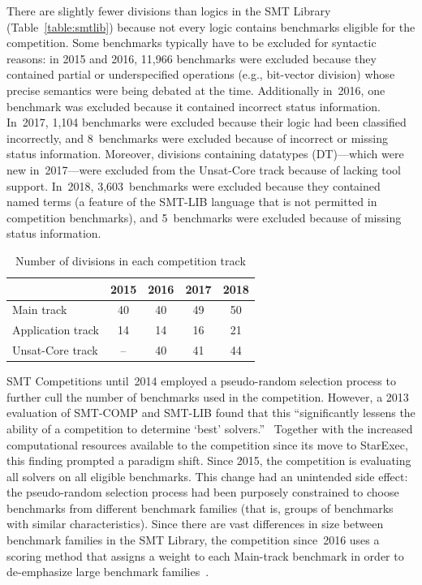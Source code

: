 \documentclass[dvipsnames,table,twoside,11pt]{article}
\begin{document}
There are slightly fewer divisions than logics in the SMT Library
(Table~\ref{table:smtlib}) because not every logic contains benchmarks
eligible for the competition.  Some benchmarks typically have to be
excluded for syntactic reasons: in 2015 and 2016, 11,966 benchmarks
were excluded because they contained partial or underspecified
operations (e.g., bit-vector division) whose precise semantics were
being debated at the time.  Additionally in~2016, one benchmark was
excluded because it contained incorrect status information.  In~2017,
1,104 benchmarks were excluded because their logic had been classified
incorrectly, and 8~benchmarks were excluded because of incorrect or
missing status information.  Moreover, divisions containing datatypes
({DT})---which were new in~2017---were excluded from the Unsat-Core
track because of lacking tool support.  In~2018, 3,603~benchmarks were
excluded because they contained named terms (a feature of the SMT-LIB
language that is not permitted in competition benchmarks), and
5~benchmarks were excluded because of missing status information.

\begin{table}
  \caption{Number of divisions in each competition track}
  \label{table:divisions}
  \centering
  \begin{tabular}{lcccc}
    \toprule
    & 2015 & 2016 & 2017 & 2018 \\
    \midrule
    Main track        &  40 & 40 & 49 & 50 \\
    Application track &  14 & 14 & 16 & 21 \\
    Unsat-Core track  &  -- & 40 & 41 & 44 \\
    \bottomrule
  \end{tabular}
\end{table}

SMT Competitions until~2014 employed a pseudo-random selection process
to further cull the number of benchmarks used in the competition.
However, a 2013 evaluation of SMT-COMP and SMT-LIB found that this
``significantly lessens the ability of a competition to determine
`best' solvers.''~\cite{CSW15} Together with the increased
computational resources available to the competition since its move to
StarExec, this finding prompted a paradigm shift.  Since 2015, the
competition is evaluating all solvers on all eligible benchmarks.
This change had an unintended side effect: the pseudo-random selection
process had been purposely constrained to choose benchmarks from
different benchmark families (that is, groups of benchmarks with
similar characteristics).  Since there are vast differences in size
between benchmark families in the SMT Library, the competition
since~2016 uses a scoring method that assigns a weight to each
Main-track benchmark in order to de-emphasize large benchmark
families~\cite{rules18}.
\end{document}
